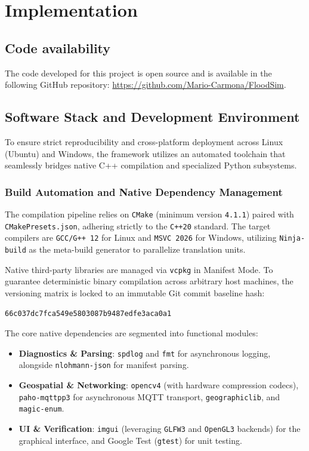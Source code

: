 \chapter{Implementation}
\label{chapter:implementation}

\section{Code availability}

The code developed for this project is open source and is available in the following GitHub repository: \url{https://github.com/Mario-Carmona/FloodSim}.

\section{Software Stack and Development Environment}
\label{section:software_stack_dev_environment}

To ensure strict reproducibility and cross-platform deployment across Linux (Ubuntu) and Windows, the framework utilizes an automated toolchain that seamlessly bridges native C++ compilation and specialized Python subsystems.

\subsection{Build Automation and Native Dependency Management}

The compilation pipeline relies on \texttt{CMake} (minimum version \texttt{4.1.1}) paired with \texttt{CMakePresets.json}, adhering strictly to the \texttt{C++20} standard. The target compilers are \texttt{GCC/G++ 12} for Linux and \texttt{MSVC 2026} for Windows, utilizing \texttt{Ninja-build} as the meta-build generator to parallelize translation units.

Native third-party libraries are managed via \texttt{vcpkg} in Manifest Mode. To guarantee deterministic binary compilation across arbitrary host machines, the versioning matrix is locked to an immutable Git commit baseline hash:
\begin{center}
    \texttt{66c037dc7fca549e5803087b9487edfe3aca0a1}
\end{center}

The core native dependencies are segmented into functional modules:
\begin{itemize}
    \item \textbf{Diagnostics \& Parsing}: \texttt{spdlog} and \texttt{fmt} for asynchronous logging, alongside \texttt{nlohmann-json} for manifest parsing.
    \item \textbf{Geospatial \& Networking}: \texttt{opencv4} (with hardware compression codecs), \texttt{paho-mqttpp3} for asynchronous MQTT transport, \texttt{geographiclib}, and \texttt{magic-enum}.
    \item \textbf{UI \& Verification}: \texttt{imgui} (leveraging \texttt{GLFW3} and \texttt{OpenGL3} backends) for the graphical interface, and Google Test (\texttt{gtest}) for unit testing.
\end{itemize}

